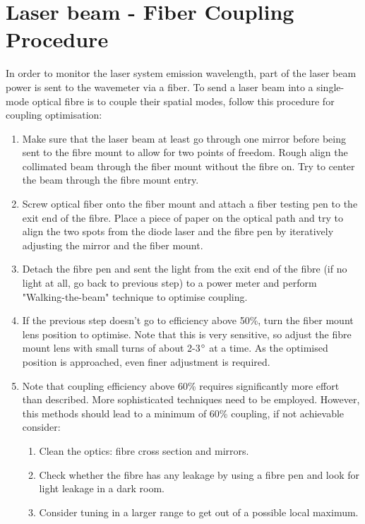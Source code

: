 \documentclass[12pt]{report}
\begin{document}
\section{Laser beam - Fiber Coupling Procedure}
In order to monitor the laser system emission wavelength, part of the laser beam power is sent to the wavemeter via a fiber. To send a laser beam into a single-mode optical fibre is to couple their spatial modes, follow this procedure for coupling optimisation: 
\begin{enumerate}
    \item Make sure that the laser beam at least go through one mirror before being sent to the fibre mount to allow for two points of freedom. Rough align the collimated beam through the fiber mount without the fibre on. Try to center the beam through the fibre mount entry. 
    \item Screw optical fiber onto the fiber mount and attach a fiber testing pen to the exit end of the fibre. Place a piece of paper on the optical path and try to align the two spots from the diode laser and the fibre pen by iteratively adjusting the mirror and the fiber mount. 
    \item Detach the fibre pen and sent the light from the exit end of the fibre (if no light at all, go back to previous step) to a power meter and perform "Walking-the-beam" technique \cite{WalkingTheBeamThorlabs} to optimise coupling. 
    \item If the previous step doesn't go to efficiency above 50\%, turn the fiber mount lens position to optimise. Note that this is very sensitive, so adjust the fibre mount lens with small turns of about 2-3$\degree$ at a time. As the optimised position is approached, even finer adjustment is required. 
    \item Note that coupling efficiency above 60\% requires significantly more effort than described. More sophisticated techniques need to be employed. However, this methods should lead to a minimum of 60\% coupling, if not achievable consider: 
    \begin{enumerate}
        \item Clean the optics: fibre cross section and mirrors.
        \item Check whether the fibre has any leakage by using a fibre pen and look for light leakage in a dark room. 
        \item Consider tuning in a larger range to get out of a possible local maximum. 
    \end{enumerate}
\end{enumerate}
\end{document}
